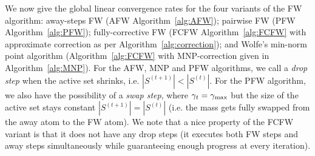 \documentclass{article} %
\newcommand{\stepsize}{\gamma}
\newcommand{\stepmax}{\stepsize_{\textnormal{\scriptsize max}}} %
\newcommand{\0}{\mathbf{0}} %
\begin{document}
We now give the global linear convergence rates for the four variants of the
FW algorithm: away-steps FW (AFW Algorithm~\ref{alg:AFW}); pairwise FW
(PFW Algorithm~\ref{alg:PFW}); fully-corrective FW (FCFW
Algorithm~\ref{alg:FCFW} with approximate correction as per Algorithm~\ref{alg:correction}); 
and Wolfe's min-norm point algorithm (Algorithm~\ref{alg:FCFW} with
MNP-correction given in Algorithm~\ref{alg:MNP}). For the AFW, MNP  and PFW algorithms, we call
a \emph{drop step} when the active set shrinks, i.e. $|S^{(t+1)}| < |S^{(t)}|$. For
the PFW algorithm, we also have the possibility of a \emph{swap step}, where
$\stepsize_t = \stepmax$ but the size of the active set stays constant $|S^{(t+1)}| = |S^{(t)}|$ 
(i.e. the mass gets
fully swapped from the away atom to the FW atom). We note that a nice
property of the FCFW variant is that it does not have any drop steps (it executes both FW
steps and away steps simultaneously while guaranteeing enough progress at
every iteration).
\end{document}
